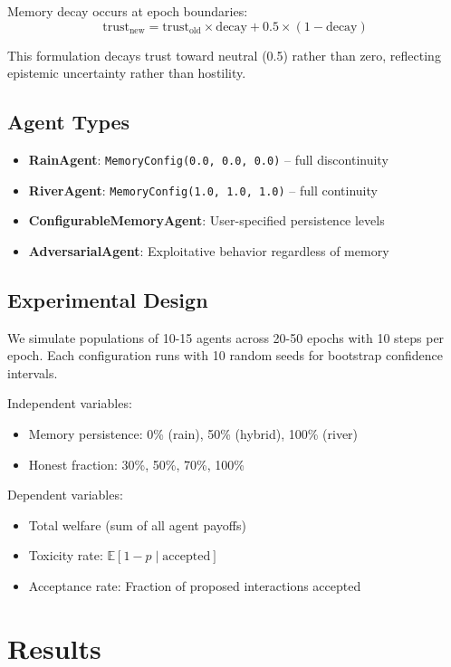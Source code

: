 \documentclass{article}
\begin{document}
Memory decay occurs at epoch boundaries:
\begin{equation}
\text{trust}_{\text{new}} = \text{trust}_{\text{old}} \times \text{decay} + 0.5 \times (1 - \text{decay})
\end{equation}

This formulation decays trust toward neutral (0.5) rather than zero, reflecting epistemic uncertainty rather than hostility.

\subsection{Agent Types}

\begin{itemize}
\item \textbf{RainAgent}: \texttt{MemoryConfig(0.0, 0.0, 0.0)} -- full discontinuity
\item \textbf{RiverAgent}: \texttt{MemoryConfig(1.0, 1.0, 1.0)} -- full continuity
\item \textbf{ConfigurableMemoryAgent}: User-specified persistence levels
\item \textbf{AdversarialAgent}: Exploitative behavior regardless of memory
\end{itemize}

\subsection{Experimental Design}

We simulate populations of 10-15 agents across 20-50 epochs with 10 steps per epoch. Each configuration runs with 10 random seeds for bootstrap confidence intervals.

Independent variables:
\begin{itemize}
\item Memory persistence: 0\% (rain), 50\% (hybrid), 100\% (river)
\item Honest fraction: 30\%, 50\%, 70\%, 100\%
\end{itemize}

Dependent variables:
\begin{itemize}
\item Total welfare (sum of all agent payoffs)
\item Toxicity rate: $\mathbb{E}[1-p \mid \text{accepted}]$
\item Acceptance rate: Fraction of proposed interactions accepted
\end{itemize}

\section{Results}
\end{document}
